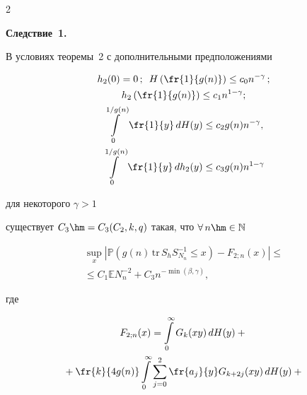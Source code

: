 \begin{multicols}{2}
 





\noindent


\textbf{Следствие~1.} 




В условиях теоремы~2 с дополнительными предположениями


\begin{gather*}


h_2(0) = 0\,; \enskip  H\left(\fr{1}{g(n)}\right)\leq c_0 n^{-\gamma}\,; \\


 h_2\left(\fr{1}{g(n)}\right)\leq c_1 n^{1-\gamma}; \\


\int\limits^{1/g(n)}_{0}\fr{1}{y}\,dH(y)\leq c_2 g(n) n^{-\gamma}, \\ 


\int\limits^{1/g(n)}_{0} \fr{1}{y} \,dh_2(y) \leq c_3 g(n) n^{1-\gamma}


\end{gather*}


для некоторого $\gamma > 1$


существует $C_3\hm=C_3(C_2,k,q)$ такая, что $ \forall\,n \hm\in \mathbb{N}$


\begin{multline*}




\sup\limits_{x} \left| \mathbb{P}\left( g(n) \,\mathrm{tr}\,S_h S^{-1}_{N_n} \leq 


x\right)  - F_{2;n}(x) \right| \leq{}\\


{}\leq C_1\mathbb{E}N_n^{-2} + C_3 n^{-\min(\beta,\gamma)},


\end{multline*}


где


\begin{multline*}


F_{2;n}(x) = \int\limits^{\infty}_{0} G_k(xy)\,dH(y) +{}\\


{}+ \fr{k}{4g(n)} 


\int\limits_{0}^\infty \sum\limits_{j=0}^{2} \fr{a_j}{y} G_{k+2j}(xy)\,dH(y) +  {} 


\end{multline*}






\end{multicols}
